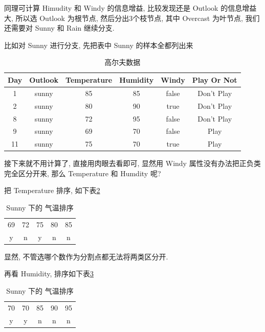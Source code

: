 \documentclass[a4paper,UTF8]{ctexart}
\theoremstyle{plain} \newtheorem{theorem}{定理}[section]
\theoremstyle{plain} \newtheorem{definition}{定义}[section]
\theoremstyle{plain} \newtheorem{lemma}{引理}[section]
\theoremstyle{plain} \newtheorem{proposition}{命题}[section]
\theoremstyle{plain} \newtheorem{example}{例}
\theoremstyle{plain} \newtheorem{remark}{注}
\theoremstyle{plain} \newtheorem{corollary}{推论}[section]
\begin{document}
同理可计算 Himudity 和 Windy 的信息增益, 比较发现还是 Outlook 的信息增益大, 所以选 Outlook 为根节点, 然后分出$3$个枝节点, 其中 Overcast 为叶节点, 我们还需要对 Sunny 和 Rain 继续分支.

比如对 Sunny 进行分支, 先把表中 Sunny 的样本全都列出来
\begin{table}[!htb]
\centering
\caption{高尔夫数据}
\label{golfsunny}
\begin{tabular}{c|c|c|c|c|c}
  \hline
    \textbf{Day} & \textbf{Outlook} & \textbf{Temperature} & \textbf{Humidity} & \textbf{Windy} & \textbf{Play Or Not} \\
    \hline
    1 & sunny & 85 & 85 & false & Don't Play \\ 
    \hline
    2 & sunny & 80 & 90 & true  & Don't Play \\ 
    \hline
    8 & sunny & 72 & 95 & false & Don't Play \\ 
    \hline
    9 & sunny & 69 & 70 & false & Play \\ 
    \hline
    11 & sunny & 75 & 70 & true & Play \\ 
  \hline
\end{tabular}
\end{table}

接下来就不用计算了, 直接用肉眼去看即可, 显然用 Windy 属性没有办法把正负类完全区分开来, 那么 Temperature 和 Humdity 呢?

把 Temperature 排序, 如下表\ref{sunnytemp}
\begin{table}[!htb]
\centering
\caption{Sunny 下的 气温排序}
\label{sunnytemp}
\begin{tabular}{ccccc}
    \hline
    69  & 72  & 75  & 80  & 85  \\
    y   & n   & y   & n   & n  \\
    \hline
\end{tabular}
\end{table}

显然, 不管选哪个数作为分割点都无法将两类区分开.

再看 Humidity, 排序如下表\ref{sunnyhumi}
\begin{table}[!htb]
\centering
\caption{Sunny 下的 气温排序}
\label{sunnyhumi}
\begin{tabular}{ccccc}
    \hline
    70  & 70  & 85  & 90  & 95  \\
    y   & y   & n   & n   & n \\ 
    \hline
\end{tabular}
\end{table}
\end{document}

